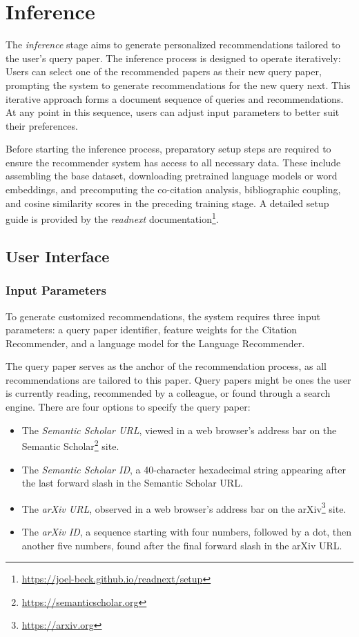 \section{Inference} \label{sec:inference}

The \emph{inference} stage aims to generate personalized recommendations tailored to the user's query paper.
The inference process is designed to operate iteratively: Users can select one of the recommended papers as their new query paper, prompting the system to generate recommendations for the new query next.
This iterative approach forms a document sequence of queries and recommendations.
At any point in this sequence, users can adjust input parameters to better suit their preferences.

Before starting the inference process, preparatory setup steps are required to ensure the recommender system has access to all necessary data. These include assembling the base dataset, downloading pretrained language models or word embeddings, and precomputing the co-citation analysis, bibliographic coupling, and cosine similarity scores in the preceding training stage. A detailed setup guide is provided by the \emph{readnext} documentation\footnote{\url{https://joel-beck.github.io/readnext/setup}}.


\subsection{User Interface} \label{sec:user-interface}

\subsubsection*{Input Parameters}

To generate customized recommendations, the system requires three input parameters: a query paper identifier, feature weights for the Citation Recommender, and a language model for the Language Recommender.

The query paper serves as the anchor of the recommendation process, as all recommendations are tailored to this paper. Query papers might be ones the user is currently reading, recommended by a colleague, or found through a search engine. There are four options to specify the query paper:

\begin{itemize}
    \item The \emph{Semantic Scholar URL}, viewed in a web browser's address bar on the Semantic Scholar\footnote{\url{https://semanticscholar.org}} site.
    \item The \emph{Semantic Scholar ID}, a 40-character hexadecimal string appearing after the last forward slash in the Semantic Scholar URL.
    \item The \emph{arXiv URL}, observed in a web browser's address bar on the arXiv\footnote{\url{https://arxiv.org}} site.
    \item The \emph{arXiv ID}, a sequence starting with four numbers, followed by a dot, then another five numbers, found after the final forward slash in the arXiv URL.
\end{itemize}

